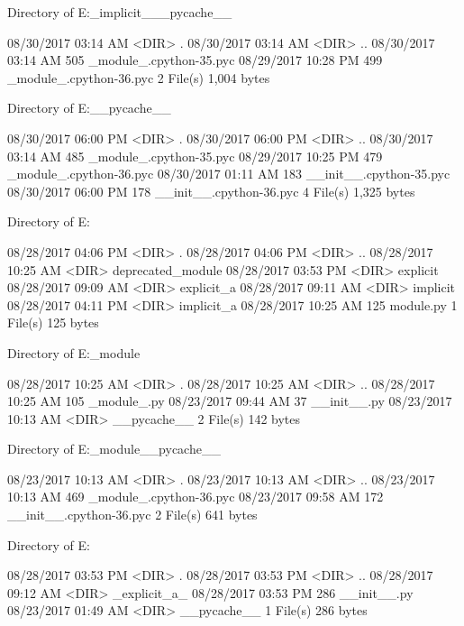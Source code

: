  Directory of E:\Python\apeman\mockup\implicitImport\_implicit_\__pycache__

08/30/2017  03:14 AM    <DIR>          .
08/30/2017  03:14 AM    <DIR>          ..
08/30/2017  03:14 AM               505 _module_.cpython-35.pyc
08/29/2017  10:28 PM               499 _module_.cpython-36.pyc
               2 File(s)          1,004 bytes

 Directory of E:\Python\apeman\mockup\implicitImport\__pycache__

08/30/2017  06:00 PM    <DIR>          .
08/30/2017  06:00 PM    <DIR>          ..
08/30/2017  03:14 AM               485 _module_.cpython-35.pyc
08/29/2017  10:25 PM               479 _module_.cpython-36.pyc
08/30/2017  01:11 AM               183 __init__.cpython-35.pyc
08/30/2017  06:00 PM               178 __init__.cpython-36.pyc
               4 File(s)          1,325 bytes

 Directory of E:\Python\apeman\mockup\simple

08/28/2017  04:06 PM    <DIR>          .
08/28/2017  04:06 PM    <DIR>          ..
08/28/2017  10:25 AM    <DIR>          deprecated_module
08/28/2017  03:53 PM    <DIR>          explicit
08/28/2017  09:09 AM    <DIR>          explicit_a
08/28/2017  09:11 AM    <DIR>          implicit
08/28/2017  04:11 PM    <DIR>          implicit_a
08/28/2017  10:25 AM               125 module.py
               1 File(s)            125 bytes

 Directory of E:\Python\apeman\mockup\simple\deprecated_module

08/28/2017  10:25 AM    <DIR>          .
08/28/2017  10:25 AM    <DIR>          ..
08/28/2017  10:25 AM               105 _module_.py
08/23/2017  09:44 AM                37 __init__.py
08/23/2017  10:13 AM    <DIR>          __pycache__
               2 File(s)            142 bytes

 Directory of E:\Python\apeman\mockup\simple\deprecated_module\__pycache__

08/23/2017  10:13 AM    <DIR>          .
08/23/2017  10:13 AM    <DIR>          ..
08/23/2017  10:13 AM               469 _module_.cpython-36.pyc
08/23/2017  09:58 AM               172 __init__.cpython-36.pyc
               2 File(s)            641 bytes

 Directory of E:\Python\apeman\mockup\simple\explicit

08/28/2017  03:53 PM    <DIR>          .
08/28/2017  03:53 PM    <DIR>          ..
08/28/2017  09:12 AM    <DIR>          _explicit_a_
08/28/2017  03:53 PM               286 __init__.py
08/23/2017  01:49 AM    <DIR>          __pycache__
               1 File(s)            286 bytes

